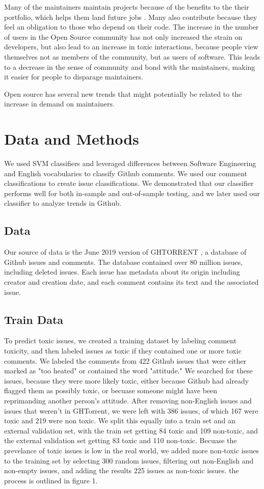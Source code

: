 \documentclass[conference]{IEEEtran}
\begin{document}
Many of the maintainers maintain projects because of the benefits to the their portfolio, which helps them land future jobs \cite{eghbal2016roads}. Many also contribute because they feel an obligation to those who depend on their code. The increase in the number of users in the Open Source community has not only increased the strain on developers, but also lead to an increase in toxic interactions, because people view themselves not as members of the community, but as users of software. This leads to a decrease in the sense of community and bond with the maintainers, making it easier for people to disparage maintainers.

Open source has several new trends that might potentially be related to the increase in demand on maintainers.  

\section{Data and Methods}
We used SVM classifiers and leveraged differences between Software Engineering and English vocabularies to classify Github comments. We used our comment classifications to create issue classifications. We demonstrated that our classifier performs well for both in-sample and out-of-sample testing, and we later used our classifier to analyze trends in Github. 

\subsection{Data}
Our source of data is the June 2019 version of GHTORRENT \cite{Gousi13}, a database of Github issues and comments. The database contained over 80 million issues, including deleted issues. Each issue has metadata about its origin including creator and creation date, and each comment contains its text and the associated issue. 

\subsection{Train Data} 

To predict toxic issues, we created a training dataset by labeling  comment toxicity, and then labeled issues as toxic if they contained one or more toxic comments. We labeled the comments from 422 Github issues that were either marked as "too heated" or contained the word "attitude." We searched for these issues, because they were more likely toxic, either because Github had already flagged them as possibly toxic, or becuase someone might have been reprimanding another person's attitude. After removing non-English issues and issues that weren't in GHTorrent, we were left with 386 issues, of which 167 were toxic and 219 were non toxic. We split this equally into a train set and an external validation set, with the train set getting 84 toxic and 109 non-toxic, and the external validation set getting 83 toxic and 110 non-toxic. Becuase the prevelance of toxic issues is low in the real world, we added more non-toxic issues to the training set by selecting 300 random issues, filtering out non-English and non-empty issues, and adding the results 225 issues as non-toxic issues. the process is outlined in figure 1. 
\end{document}
